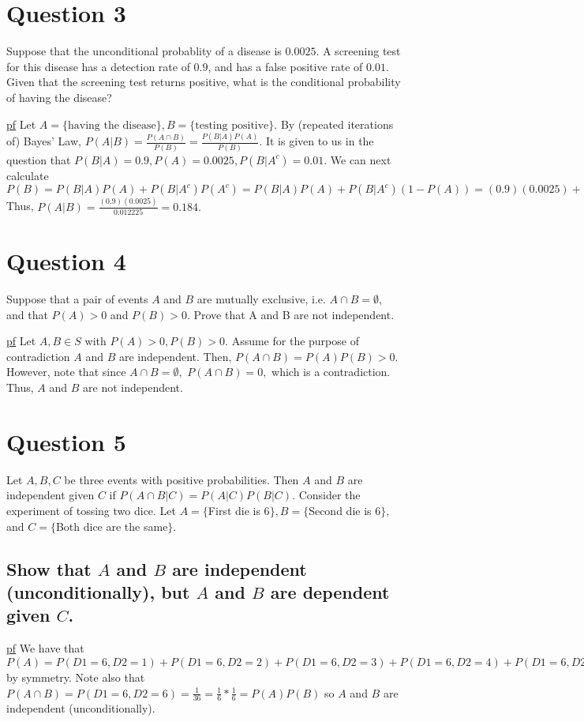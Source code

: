 \documentclass[11pt]{article} %
\begin{document}
\section{Question 3}
Suppose that the unconditional probablity of a disease is $0.0025$. A screening test for this disease has a detection rate of $0.9$, and has a false positive rate of $0.01$. Given that the screening test returns positive, what is the conditional probability of having the disease?

\underline{pf} Let $A = \{ \text{having the disease}\}, B = \{ \text{testing positive}\}$. By (repeated iterations of) Bayes' Law, $P(A|B) = \frac{P(A\cap B)}{P(B)} = \frac{P(B|A)P(A)}{P(B)}$. It is given to us in the question that $P(B|A) = 0.9, P(A) = 0.0025, P(B|A^{c}) = 0.01.$ We can next calculate $P(B) = P(B|A)P(A) + P(B|A^{c})P(A^{c}) = P(B|A)P(A) + P(B|A^{c})(1-P(A)) = (0.9)(0.0025) + (0.01)(0.9975) = 0.012225.$ Thus, $P(A|B) = \frac{(0.9)(0.0025)}{0.012225} = 0.184.$

\section{Question 4}
Suppose that a pair of events $A$ and $B$ are mutually exclusive, i.e. $A \cap B = \emptyset,$ and that $P(A)>0$ and $P(B) > 0.$ Prove that A and B are not independent.

\underline{pf} Let $A,B \in S$ with $P(A)>0, P(B)>0.$ Assume for the purpose of contradiction $A$ and $B$ are independent. Then, $P(A \cap B) = P(A)P(B)>0.$ However, note that since $A \cap B = \emptyset,$ $P(A\cap B) = 0,$ which is a contradiction. Thus, $A$ and $B$ are not independent.

\section{Question 5}
Let $A,B,C$ be three events with positive probabilities. Then $A$ and $B$ are independent given $C$ if $P(A \cap B|C) = P(A|C)P(B|C).$ Consider the experiment of tossing two dice. Let $A = \{$First die is 6$\}, B = \{$Second die is 6$\}, $ and $C = \{$Both dice are the same$\}.$

\subsection{Show that $A$ and $B$ are independent (unconditionally), but $A$ and $B$ are dependent given $C$.}
\underline{pf} We have that $P(A) = P(D1 = 6, D2 =1) + P(D1 = 6, D2 =2) + P(D1 = 6, D2 =3) + P(D1 = 6, D2 =4) + P(D1 = 6, D2 =5) + P(D1 = 6, D2 =6) = \frac{1}{6} = P(B)$ by symmetry. Note also that $P(A\cap B) = P(D1 = 6, D2 = 6) = \frac{1}{36} = \frac{1}{6} *\frac{1}{6} = P(A)P(B)$ so $A$ and $B$ are independent (unconditionally).
\end{document}
